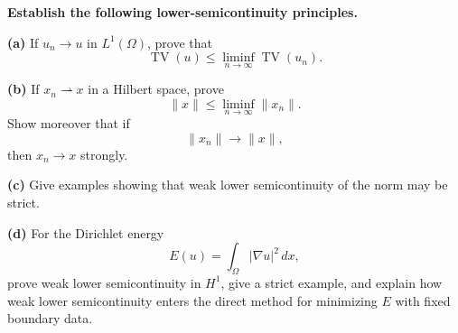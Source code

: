 \begin{problem}[CP-II-0451]
\label{prob:cp-ii-0451}
\textbf{Establish the following lower-semicontinuity principles.}

\par\hspace*{1.5em}\textbf{(a)}\quad
If \(u_n\to u\) in \(L^1(\Omega)\), prove that
\[
\operatorname{TV}(u)
\le
\liminf_{n\to\infty}\operatorname{TV}(u_n).
\]

\par\noindent\textbf{(b)}\quad
If \(x_n\rightharpoonup x\) in a Hilbert space, prove
\[
\|x\|\le\liminf_{n\to\infty}\|x_n\|.
\]
Show moreover that if
\[
\|x_n\|\to\|x\|,
\]
then \(x_n\to x\) strongly.

\par\noindent\textbf{(c)}\quad
Give examples showing that weak lower semicontinuity of the norm may
be strict.

\par\noindent\textbf{(d)}\quad
For the Dirichlet energy
\[
E(u)=\int_\Omega|\nabla u|^2\,dx,
\]
prove weak lower semicontinuity in \(H^1\), give a strict example, and
explain how weak lower semicontinuity enters the direct method for
minimizing \(E\) with fixed boundary data.
\end{problem}

